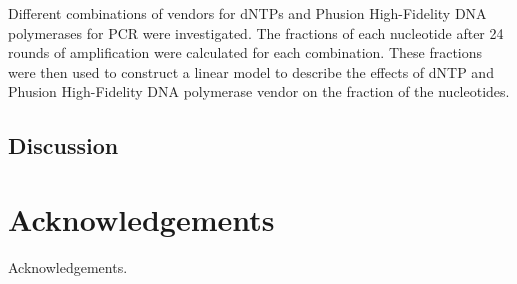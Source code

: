 \documentclass[parskip=full, numbers=noenddot]{scrreprt}
\begin{document}
Different combinations of vendors for dNTPs and Phusion High-Fidelity DNA polymerases for PCR were investigated.  The fractions of each nucleotide after 24 rounds of amplification were calculated for each combination.  These fractions were then used to construct a linear model %
to describe the effects of dNTP and Phusion High-Fidelity DNA polymerase vendor on the fraction of the nucleotides. %

\section{Discussion}
\label{sec:pcrbias_discussion}

\chapter{Acknowledgements}
\label{ch:ack}

Acknowledgements.

\printbibliography
\end{document}
